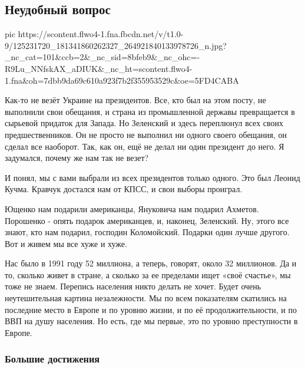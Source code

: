  
 
 

\subsection{Неудобный вопрос}
\label{sec:13_11_2020.fb.alex_belyy.1.neudobnyy_vopros}

\ifcmt
pic https://scontent.flwo4-1.fna.fbcdn.net/v/t1.0-9/125231720_181341860262327_264921840133978726_n.jpg?_nc_cat=101&ccb=2&_nc_sid=8bfeb9&_nc_ohc=-R9Lu_NNfskAX_aDIUK&_nc_ht=scontent.flwo4-1.fna&oh=7dbb9da69c610a923f7b2f355953529c&oe=5FD4CABA
\fi

Как-то не везёт Украине на президентов. Все, кто был на этом посту, не
выполнили свои обещания, и страна из промышленной державы превращается в
сырьевой придаток для Запада. Но Зеленский и здесь переплюнул всех своих
предшественников. Он не просто не выполнил ни одного своего обещания, он сделал
все наоборот. Так, как он, ещё не делал ни один президент до него. Я задумался,
почему же нам так не везет? 

И понял, мы с вами выбрали из всех президентов только одного.  Это был Леонид
Кучма.  Кравчук достался нам от КПСС, и свои выборы проиграл.  

Ющенко нам подарили американцы, Януковича нам подарил Ахметов. Порошенко -
опять подарок американцев, и, наконец, Зеленский. Ну, этого все знают, кто нам
подарил, господин Коломойский. Подарки один лучше другого. Вот и живем мы все
хуже и хуже. 

Нас было в 1991 году 52 миллиона, а теперь, говорят, около 32 миллионов. Да и
то, сколько живет в стране, а сколько за ее пределами ищет «своё счастье», мы
тоже не знаем. Перепись населения никто делать не хочет. Будет очень
неутешительная картина незалежности. Мы по всем показателям скатились на
последние место в Европе и по уровню жизни, и по её продолжительности, и по ВВП
на душу населения. Но есть, где мы первые, это по уровню преступности в Европе. 

\subsubsection{Большие достижения}


